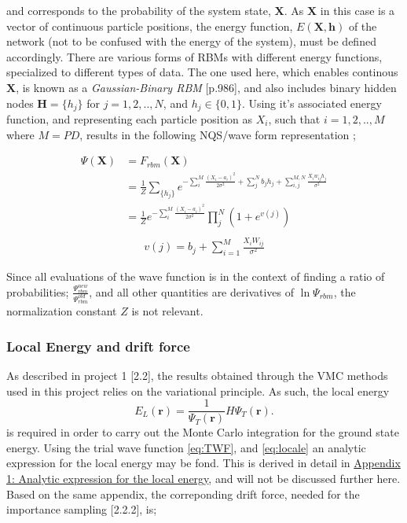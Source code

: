 \documentclass[%
oneside,                 %
final,                   %
10pt]{article}
\begin{document}
and corresponds to the probability of the system state, $\bm X$. As $\bm X$ in this case is a vector of continuous particle positions, the energy function, $E(\bm X, \bm h)$ of the network (not to be confused with the energy of the system), must be defined accordingly. There are various forms of RBMs with different energy functions, specialized to different types of data. The one used here, which enables continous $\bm X$, is known as a \textit{Gaussian-Binary RBM} \cite{MLMurphy}[p.986], and also includes binary hidden nodes $\bm H=\{h_j\}$ for $j=1,2,..,N$, and $h_j \in \{0,1\}$. Using it's associated energy function, and representing each particle position as $X_i$, such that $i=1,2,..,M$ where $M=PD$, results in the following NQS/wave form representation \cite{MLoppgave}; 

\begin{equation}
\begin{aligned}
\Psi (\mathbf{X}) &= F_{rbm}(\mathbf{X}) \\
&= \frac{1}{Z} \sum_{\{h_j\}} e^{-\sum_i^M \frac{(X_i - a_i)^2}{2\sigma^2} + \sum_j^N b_j h_j + \sum_{i,j}^{M,N} \frac{X_i w_{ij} h_j}{\sigma^2}} \\
&= \frac{1}{Z} e^{-\sum_i^M \frac{(X_i - a_i)^2}{2\sigma^2}} \prod_j^N (1 + e^{ v(j)}) \\
\end{aligned}
\end{equation}
\begin{equation}
\begin{aligned}
v(j) = b_j + \sum_{i=1}^M \frac{X_i W_{ij} }{\sigma^2}
\end{aligned}
\label{eq:v_j}
\end{equation}

Since all evaluations of the wave function is in the context of finding a ratio of probabilities; $\frac{\Psi_{rbm}^{new}}{\Psi_{rbm}^{old}}$, and all other quantities are derivatives of $\ln \Psi_{rbm}$, the normalization constant $Z$ is not relevant.


\subsubsection{Local Energy and drift force}
As described in project 1 \cite{JN_P1}[2.2], the results obtained through the VMC methods used in this project relies on the variational principle. As such, the local energy
\begin{equation}
    E_L(\mathbf{r})=\frac{1}{\Psi_T(\mathbf{r})}H\Psi_T(\mathbf{r}).
    \label{eq:locale}
 \end{equation}
is required in order to carry out the Monte Carlo integration for the ground state energy. Using the trial wave function \eqref{eq:TWF}, and \eqref{eq:locale} an analytic expression for the local energy may be fond. This is derived in detail in \hyperref[APP_1]{Appendix 1: Analytic expression for the local energy}, and will not be discussed further here. Based on the same appendix, the correponding drift force, needed for the importance sampling \cite{JN_P1}[2.2.2], is;
\end{document}
